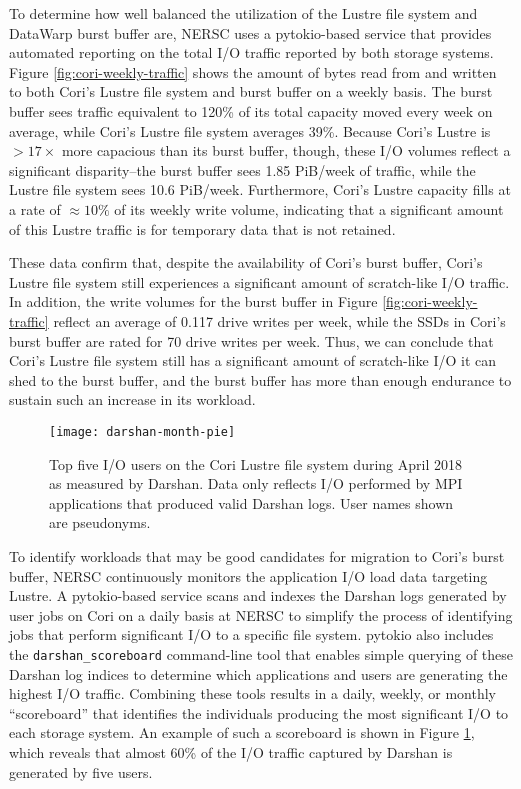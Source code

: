 To determine how well balanced the utilization of the Lustre file system and DataWarp burst buffer are, NERSC uses a pytokio-based service that provides automated reporting on the total I/O traffic reported by both storage systems.
Figure \ref{fig:cori-weekly-traffic} shows the amount of bytes read from and written to both Cori's Lustre file system and burst buffer on a weekly basis.
The burst buffer sees traffic equivalent to 120\% of its total capacity moved every week on average, while Cori's Lustre file system averages 39\%.
Because Cori's Lustre is ${> 17 \times}$ more capacious than its burst buffer, though, these I/O volumes reflect a significant disparity--the burst buffer sees 1.85 PiB/week of traffic, while the Lustre file system sees 10.6 PiB/week.
Furthermore, Cori's Lustre capacity fills at a rate of $\approx 10\%$ of its weekly write volume, indicating that a significant amount of this Lustre traffic is for temporary data that is not retained.

These data confirm that, despite the availability of Cori's burst buffer, Cori's Lustre file system still experiences a significant amount of scratch-like I/O traffic.
In addition, the write volumes for the burst buffer in Figure \ref{fig:cori-weekly-traffic} reflect an average of 0.117 drive writes per week, while the SSDs in Cori's burst buffer are rated for 70 drive writes per week.
Thus, we can conclude that Cori's Lustre file system still has a significant amount of scratch-like I/O it can shed to the burst buffer, 
and the burst buffer has more than enough endurance to sustain such an increase in its workload.

\begin{figure}
    \centering
    \texttt{[image: darshan-month-pie]}
    \vspace{-.2in}
    \caption{%
    Top five I/O users on the Cori Lustre file system during April 2018 as measured by Darshan.
    Data only reflects I/O performed by MPI applications that produced valid Darshan logs.
    User names shown are pseudonyms.
    }
    \label{fig:darshan-month-pie}
    \vspace{-.2in}
\end{figure}

To identify workloads that may be good candidates for migration to Cori's burst buffer, NERSC continuously monitors the application I/O load data targeting Lustre.
A pytokio-based service scans and indexes the Darshan logs generated by user jobs on Cori on a daily basis at NERSC to simplify the process of identifying jobs that perform significant I/O to a specific file system.
pytokio also includes the \texttt{darshan\_scoreboard} command-line tool that enables simple querying of these Darshan log indices to determine which applications and users are generating the highest I/O traffic.
Combining these tools results in a daily, weekly, or monthly ``scoreboard'' that identifies the individuals producing the most significant I/O to each storage system.
An example of such a scoreboard is shown in Figure \ref{fig:darshan-month-pie}, which reveals that almost 60\% of the I/O traffic captured by Darshan is generated by five users.

